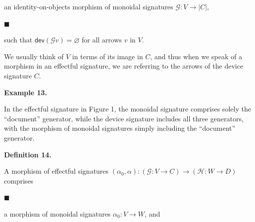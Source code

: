 an identity-on-objects morphism of monoidal signatures $\mathcal{G}:V\to|C|$,\par
 
 
 
\par\noindent  $\blacksquare$ 
 
such that $\mathsf{dev}(\mathcal{G}v)=\varnothing$ for all arrows $v$ in $V$.\par
 
 
  
 
 
 
We usually think of $V$ in terms of its image in $C$, and thus when we speak of a morphism in an effectful signature, we are referring to the arrows of the device signature $C$.\par
 
 
 
\par\medskip\noindent\textbf{Example 13.}\par
 
 
In the effectful signature in Figure 1, the monoidal signature comprises solely the “document” generator, while the device signature includes all three generators, with the morphism of monoidal signatures simply including the “document” generator.\par
 
 
 
 
\par\medskip\noindent\textbf{Definition 14.}\par
 
 
A morphism of effectful signatures $(\alpha_{0},\alpha):(\mathcal{G}:V\to C)\to(\mathcal{H}:W\to D)$ comprises\par
  
\par\noindent  $\blacksquare$ 
 
a morphism of monoidal signatures $\alpha_{0}:V\to W$, and\par
 
